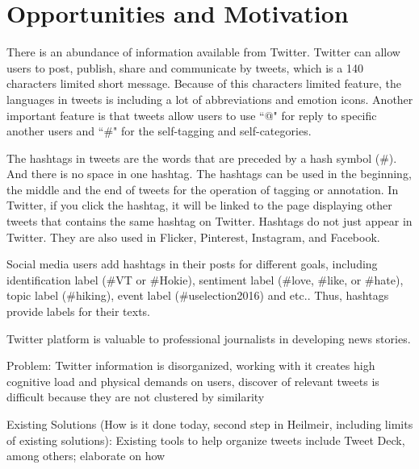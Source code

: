 




\section{Opportunities and Motivation}

There is an abundance of information available from Twitter. Twitter can allow users to post, publish, share and communicate by tweets, which is a 140 characters limited short message. Because of this characters limited feature, the languages in tweets is including a lot of abbreviations and emotion icons. Another important feature is that tweets allow users to use ``@" for reply to specific another users and ``\#" for the self-tagging and self-categories. 

The hashtags in tweets are the words that are preceded by a hash symbol (\#). And there is no space in one hashtag. The hashtags can be used in the beginning, the middle and the end of tweets for the operation of tagging or annotation. In Twitter, if you click the hashtag, it will be linked to the page displaying other tweets that contains the same hashtag on Twitter. Hashtags do not just appear in Twitter. They are also used in Flicker, Pinterest, Instagram, and Facebook. 


Social media users add hashtags in their posts for different goals, including identification label (\#VT or \#Hokie), sentiment label (\#love, \#like, or \#hate), topic label (\#hiking), event label (\#uselection2016) and etc.. Thus, hashtags provide labels for their texts.



Twitter platform is valuable to professional journalists in developing news stories. 

Problem: Twitter information is disorganized, working with it creates high cognitive load and physical demands on users, discover of relevant tweets is difficult because they are not clustered by similarity 

Existing Solutions (How is it done today, second step in Heilmeir, including limits of existing solutions): Existing tools to help organize tweets include Tweet Deck, among others; elaborate on how












